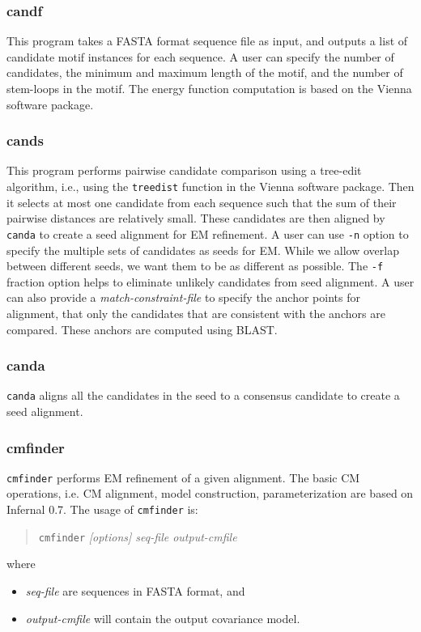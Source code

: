 \documentclass[letterpaper,12pt]{report}
\begin{document}
\subsubsection{candf}

This program takes a FASTA format sequence file as input, and outputs a list of candidate motif 
instances for each sequence. A user can specify the number of candidates, the minimum and maximum length of 
the motif, and the number of stem-loops in the motif. The energy function computation is based on the Vienna software package.

\subsubsection{cands}

This program performs pairwise candidate comparison using a tree-edit algorithm, i.e., using the {\tt treedist} 
function in the Vienna software package. Then it selects at most one candidate from each sequence such that the sum of their pairwise 
distances are relatively small. 
These candidates are then aligned by {\tt canda} to create a seed alignment for EM refinement.
A user can use {\tt -n} option to specify the multiple sets of candidates as seeds for EM.
While we allow overlap between different seeds, we want them to be as different as possible.
The {\tt -f} fraction option helps to eliminate unlikely candidates from seed alignment. 
A user can also provide a {\it match-constraint-file} to specify the anchor points for alignment,
that only the candidates that are consistent with the anchors are compared.
These anchors are computed using BLAST.

\subsubsection{canda}

{\tt canda} aligns all the candidates in the seed to a consensus candidate to create a seed alignment. 

\subsubsection{cmfinder}
\label{cmfinder03}

{\tt cmfinder} performs EM refinement of a given alignment. The basic CM operations, i.e. CM alignment,
model construction, parameterization are based on Infernal 0.7. The usage of {\tt cmfinder} is:

\begin{quote}
{\tt cmfinder} {\it [options] seq-file output-cmfile}
\end{quote}
where
\begin{itemize}
\item {\it seq-file} are sequences in FASTA format, and
\item {\it output-cmfile} will contain the output covariance model. 
\end{itemize}
\end{document}
